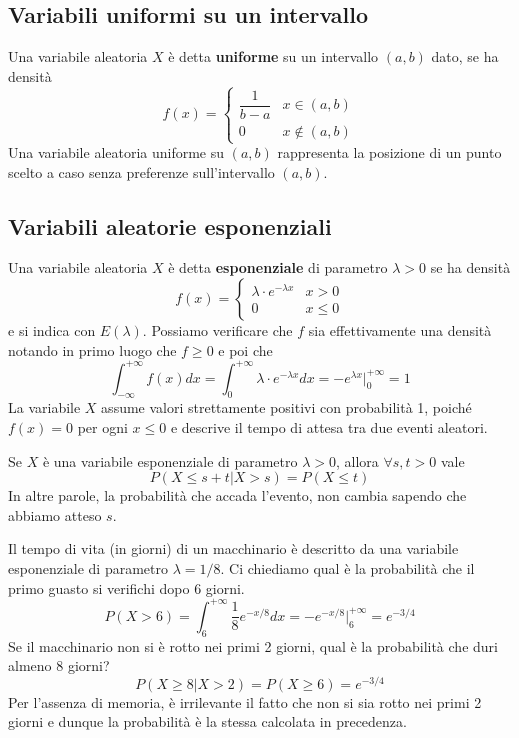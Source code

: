 \subsection{Variabili uniformi su un intervallo}
Una variabile aleatoria $X$ è detta \textbf{uniforme} su un intervallo $(a, b)$ dato, se ha densità
\[
	f(x) = \begin{cases}
		\dfrac{1}{b - a} & x \in (a, b)    \\[2ex]
		0                & x \notin (a, b)
	\end{cases}
\]
Una variabile aleatoria uniforme su $(a,b)$ rappresenta la posizione di un punto scelto a caso
senza preferenze sull'intervallo $(a, b)$.

\subsection{Variabili aleatorie esponenziali}
Una variabile aleatoria $X$ è detta \textbf{esponenziale} di parametro $\lambda > 0$ se ha densità
\[
	f(x) = \begin{cases}
		\lambda \cdot e^{-\lambda x} & x > 0    \\[2ex]
		0                            & x \leq 0
	\end{cases}
\]
e si indica con $E(\lambda)$. Possiamo verificare che $f$ sia effettivamente una densità notando
in primo luogo che $f \geq 0$ e poi che
\[
	\int_{-\infty}^{+\infty} f(x) dx =
	\int_0^{+\infty} \lambda \cdot e^{-\lambda x} dx =
	-e^{\lambda x} \Big|_0^{+\infty} = 1
\]
La variabile $X$ assume valori strettamente positivi con probabilità 1, poiché $f(x) = 0$ per ogni
$x \leq 0$ e descrive il tempo di attesa tra due eventi aleatori.

\begin{proposition}
	Se $X$ è una variabile esponenziale di parametro $\lambda > 0$, allora $\forall s,t > 0$ vale
	\[ P(X \leq s + t | X > s) = P(X \leq t) \]
	In altre parole, la probabilità che accada l'evento, non cambia sapendo che abbiamo atteso $s$.
\end{proposition}

\begin{example}
	Il tempo di vita (in giorni) di un macchinario è descritto da una variabile esponenziale di
	parametro $\lambda = 1/8$. Ci chiediamo qual è la probabilità che il primo guasto si
	verifichi dopo 6 giorni.
	\[
		P(X > 6) = \int_{6}^{+\infty} \frac{1}{8} e^{-x/8} dx =
		-e^{-x/8} \Big|_6^{+\infty} = e^{-3/4}
	\]
	Se il macchinario non si è rotto nei primi 2 giorni, qual è la probabilità che duri almeno 8
	giorni?
	\[ P(X \geq 8 | X > 2) = P(X \geq 6) = e^{-3/4} \]
	Per l'assenza di memoria, è irrilevante il fatto che non si sia rotto nei primi 2 giorni e
	dunque la probabilità è la stessa calcolata in precedenza.
\end{example}

